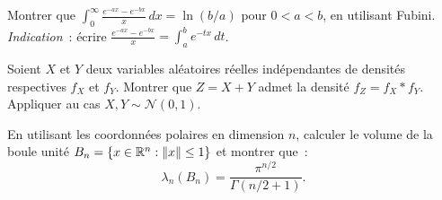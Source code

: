 \begin{exercice}
Montrer que $\int_0^{\infty} \frac{e^{-ax} - e^{-bx}}{x}\, dx = \ln(b/a)$ pour
$0 < a < b$, en utilisant Fubini.
\emph{Indication}~: \'ecrire $\frac{e^{-ax} - e^{-bx}}{x} = \int_a^b e^{-tx}\, dt$.
\end{exercice}

\begin{exercice}
Soient $X$ et $Y$ deux variables al\'eatoires r\'eelles ind\'ependantes de densit\'es
respectives $f_X$ et $f_Y$. Montrer que $Z = X + Y$ admet la densit\'e
$f_Z = f_X * f_Y$. Appliquer au cas $X, Y \sim \mathcal{N}(0,1)$.
\end{exercice}

\begin{exercice}
En utilisant les coordonn\'ees polaires en dimension $n$, calculer le volume de la
boule unit\'e $B_n = \{x \in \mathbb{R}^n : \left\| x \right\| \leq 1\}$ et montrer que~:
\[
    \lambda_n(B_n) = \frac{\pi^{n/2}}{\Gamma(n/2 + 1)}.
\]
\end{exercice}
